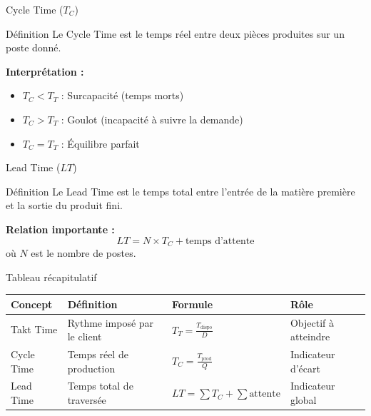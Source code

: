 \documentclass{beamer}
\begin{document}
\begin{frame}{Cycle Time ($T_C$)}
    \begin{block}{Définition}
        Le Cycle Time est le temps réel entre deux pièces produites sur un poste donné.
    \end{block}
    
    \begin{center}
    \end{center}
    
    \vspace{0.3cm}
    \textbf{Interprétation :}
    \begin{itemize}
        \item $T_C < T_T$ : Surcapacité (temps morts)
        \item $T_C > T_T$ : Goulot (incapacité à suivre la demande)
        \item $T_C = T_T$ : Équilibre parfait
    \end{itemize}
\end{frame}

\begin{frame}{Lead Time ($LT$)}
    \begin{block}{Définition}
        Le Lead Time est le temps total entre l'entrée de la matière première et la sortie du produit fini.
    \end{block}
    
    \begin{center}
    \end{center}
    
    \vspace{0.3cm}
    \textbf{Relation importante :}
    \[
    LT = N \times T_C + \text{temps d'attente}
    \]
    où $N$ est le nombre de postes.
\end{frame}

\begin{frame}{Tableau récapitulatif}
    \begin{table}[H]
    \centering
    \begin{tabular}{|p{2.2cm}|p{3cm}|p{3cm}|p{3cm}|}
    \hline
    \textbf{Concept} & \textbf{Définition} & \textbf{Formule} & \textbf{Rôle} \\
    \hline
    Takt Time & Rythme imposé par le client & $T_T = \frac{T_{\text{dispo}}}{D}$ & Objectif à atteindre \\
    \hline
    Cycle Time & Temps réel de production & $T_C = \frac{T_{\text{prod}}}{Q}$ & Indicateur d'écart \\
    \hline
    Lead Time & Temps total de traversée & $LT = \sum T_C + \sum \text{attente}$ & Indicateur global \\
    \hline
    \end{tabular}
    \end{table}
\end{frame}
\end{document}
